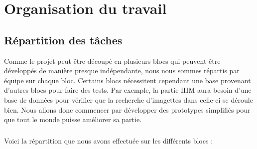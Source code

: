 \chapter{Organisation du travail}

\section{Répartition des tâches}

Comme le projet peut être découpé en plusieurs blocs qui peuvent être
développés de manière presque indépendante, nous nous sommes répartis
par équipe sur chaque bloc. Certains blocs nécessitent
cependant une base provenant d’autres blocs pour faire des tests.
Par exemple, la partie IHM aura besoin d’une base de données pour
vérifier que la recherche d’imagettes dans celle-ci se déroule bien.
Nous allons donc commencer par développer des prototypes simplifiés
pour que tout le monde puisse améliorer sa partie.

\paragraph{}
Voici la répartition que nous avons effectuée sur les différents blocs :

